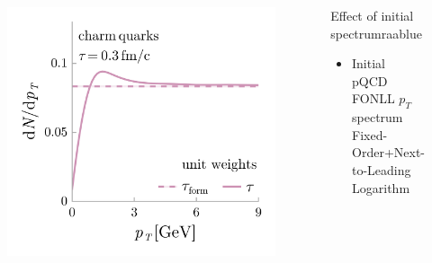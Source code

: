 \documentclass[aspectratio=169,11pt,usenames,dvipsnames]{beamer}
\begin{document}
\begin{frame}
\begin{columns}[onlytextwidth,t]
\begin{center}
            \vspace{-15pt}
            \begin{figure}
                \centering
                \includegraphics[height=0.63\textheight]{images/final_sketch_raa_gl_fonll_v4_gl.png}
            \end{figure}
        \end{center}
        

       \begin{center}
        \begin{custombox2}{{\normalsize Effect of initial spectrum}}{raablue}
            \small
            \begin{varwidth}{0.91\textwidth}
            \begin{itemize}\itemsep0em 
                \itemsep0em
                \footnotesize
                \item Initial pQCD FONLL $p_T$ spectrum\\
                {\scriptsize\color{lightgray}Fixed-Order+Next-to-Leading Logarithm}
            \end{itemize}
            \end{varwidth}
        \end{custombox2}


\end{center}
\end{columns}
\end{frame}
\end{document}
